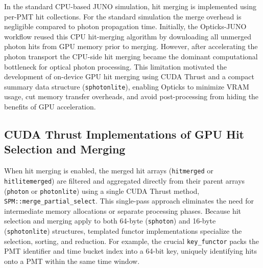 \documentclass{webofc}
\begin{document}
In the standard CPU-based JUNO simulation, hit merging is implemented using per-PMT hit collections. 
For the standard simulation the merge overhead is negligible compared to photon propagation time.
%
Initially, the Opticks-JUNO workflow reused this CPU hit-merging algorithm 
by downloading all unmerged photon hits from GPU memory prior to merging.
However, after accelerating the photon transport the
CPU-side hit merging became the dominant computational bottleneck for optical photon processing. 
This limitation motivated the development of on-device GPU hit merging using CUDA Thrust 
and a compact summary data structure (\texttt{sphotonlite}), enabling Opticks to minimize 
VRAM usage, cut memory transfer overheads, and avoid post-processing from hiding the benefits of GPU acceleration.
%
%
\subsection{CUDA Thrust Implementations of GPU Hit Selection and Merging}
\label{sec:hitmerge}
%
%
%
When hit merging is enabled, the merged hit arrays (\texttt{hitmerged} or
\texttt{hitlitemerged}) are filtered and aggregated directly from their parent
arrays (\texttt{photon} or \texttt{photonlite}) using a single CUDA Thrust
method, \texttt{SPM::merge\_partial\_select}. This single-pass approach
eliminates the need for intermediate memory allocations or separate processing
phases.  Because hit selection and merging apply to both 64-byte
(\texttt{sphoton}) and 16-byte (\texttt{sphotonlite}) structures, templated
functor implementations specialize the selection, sorting, and reduction.
For example, the crucial \texttt{key\_functor} packs the PMT identifier and time
bucket index into a 64-bit key, uniquely identifying hits onto a PMT within 
the same time window.
\end{document}
